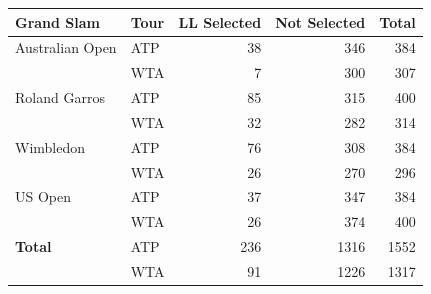 \begin{tabular}{llrrr}
\toprule
Grand Slam & Tour & LL Selected & Not Selected & Total \\
\midrule
Australian Open & ATP & 38 & 346 & 384 \\
 & WTA & 7 & 300 & 307 \\
\addlinespace
Roland Garros & ATP & 85 & 315 & 400 \\
 & WTA & 32 & 282 & 314 \\
\addlinespace
Wimbledon & ATP & 76 & 308 & 384 \\
 & WTA & 26 & 270 & 296 \\
\addlinespace
US Open & ATP & 37 & 347 & 384 \\
 & WTA & 26 & 374 & 400 \\
\midrule
\textbf{Total} & ATP & 236 & 1316 & 1552 \\
 & WTA & 91 & 1226 & 1317 \\
\bottomrule
\end{tabular}

